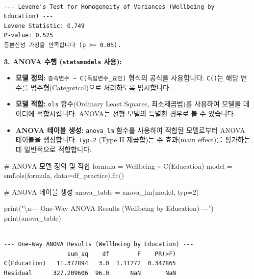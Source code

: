 \documentclass[
  letterpaper,
]{book}
\newenvironment{Shaded}{\begin{snugshade}}{\end{snugshade}}
\newcommand{\BuiltInTok}[1]{\textcolor[rgb]{0.00,0.23,0.31}{#1}}
\newcommand{\CharTok}[1]{\textcolor[rgb]{0.13,0.47,0.30}{#1}}
\newcommand{\CommentTok}[1]{\textcolor[rgb]{0.37,0.37,0.37}{#1}}
\newcommand{\DecValTok}[1]{\textcolor[rgb]{0.68,0.00,0.00}{#1}}
\newcommand{\NormalTok}[1]{\textcolor[rgb]{0.00,0.23,0.31}{#1}}
\newcommand{\OperatorTok}[1]{\textcolor[rgb]{0.37,0.37,0.37}{#1}}
\newcommand{\StringTok}[1]{\textcolor[rgb]{0.13,0.47,0.30}{#1}}
\providecommand{\tightlist}{%
  \setlength{\itemsep}{0pt}\setlength{\parskip}{0pt}}
\begin{document}
\begin{verbatim}

--- Levene's Test for Homogeneity of Variances (Wellbeing by Education) ---
Levene Statistic: 0.749
P-value: 0.525
등분산성 가정을 만족합니다 (p >= 0.05).
\end{verbatim}

\textbf{3. ANOVA 수행 (\texttt{statsmodels} 사용):}

\begin{itemize}
\tightlist
\item
  \textbf{모델 정의:}
  \texttt{종속변수\ \textasciitilde{}\ C(독립변수\_요인)} 형식의 공식을
  사용합니다. \texttt{C()}는 해당 변수를 범주형(Categorical)으로
  처리하도록 명시합니다.
\item
  \textbf{모델 적합:} \texttt{ols} 함수(Ordinary Least Squares,
  최소제곱법)를 사용하여 모델을 데이터에 적합시킵니다. ANOVA는 선형
  모델의 특별한 경우로 볼 수 있습니다.
\item
  \textbf{ANOVA 테이블 생성:} \texttt{anova\_lm} 함수를 사용하여 적합된
  모델로부터 ANOVA 테이블을 생성합니다. \texttt{typ=2} (Type II
  제곱합)는 주 효과(main effect)를 평가하는 데 일반적으로 적합합니다.
\end{itemize}

\begin{Shaded}
\begin{Highlighting}[]
\CommentTok{\# ANOVA 모델 정의 및 적합}
\NormalTok{formula }\OperatorTok{=} \StringTok{\textquotesingle{}Wellbeing \textasciitilde{} C(Education)\textquotesingle{}}
\NormalTok{model }\OperatorTok{=}\NormalTok{ smf.ols(formula, data}\OperatorTok{=}\NormalTok{df\_practice).fit()}

\CommentTok{\# ANOVA 테이블 생성}
\NormalTok{anova\_table }\OperatorTok{=}\NormalTok{ anova\_lm(model, typ}\OperatorTok{=}\DecValTok{2}\NormalTok{)}

\BuiltInTok{print}\NormalTok{(}\StringTok{"}\CharTok{\textbackslash{}n}\StringTok{{-}{-}{-} One{-}Way ANOVA Results (Wellbeing by Education) {-}{-}{-}"}\NormalTok{)}
\BuiltInTok{print}\NormalTok{(anova\_table)}
\end{Highlighting}
\end{Shaded}

\begin{verbatim}

--- One-Way ANOVA Results (Wellbeing by Education) ---
                  sum_sq    df        F    PR(>F)
C(Education)   11.377894   3.0  1.11272  0.347865
Residual      327.209606  96.0      NaN       NaN
\end{verbatim}
\end{document}
